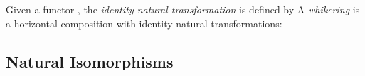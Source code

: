 Given a functor
, the \textit{identity natural transformation}
is defined by
A \textit{whikering} is a horizontal composition with identity natural transformations:


\subsection{Natural Isomorphisms}

